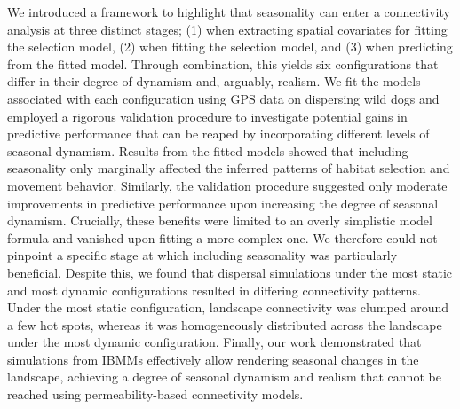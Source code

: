 \documentclass[../FinalThesis.tex]{subfiles}
\begin{document}
We introduced a framework to highlight that seasonality can enter a connectivity
analysis at three distinct stages; (1) when extracting spatial covariates for
fitting the selection model, (2) when fitting the selection model, and (3) when
predicting from the fitted model. Through combination, this yields six
configurations that differ in their degree of dynamism and, arguably, realism.
We fit the models associated with each configuration using GPS data on
dispersing wild dogs and employed a rigorous validation procedure to investigate
potential gains in predictive performance that can be reaped by incorporating
different levels of seasonal dynamism. Results from the fitted models showed
that including seasonality only marginally affected the inferred patterns of
habitat selection and movement behavior. Similarly, the validation procedure
suggested only moderate improvements in predictive performance upon increasing
the degree of seasonal dynamism. Crucially, these benefits were limited to an
overly simplistic model formula and vanished upon fitting a more complex one. We
therefore could not pinpoint a specific stage at which including seasonality was
particularly beneficial. Despite this, we found that dispersal simulations under
the most static and most dynamic configurations resulted in differing
connectivity patterns. Under the most static configuration, landscape
connectivity was clumped around a few hot spots, whereas it was homogeneously
distributed across the landscape under the most dynamic configuration. Finally,
our work demonstrated that simulations from IBMMs effectively allow rendering
seasonal changes in the landscape, achieving a degree of seasonal dynamism and
realism that cannot be reached using permeability-based connectivity models.

\end{document}
